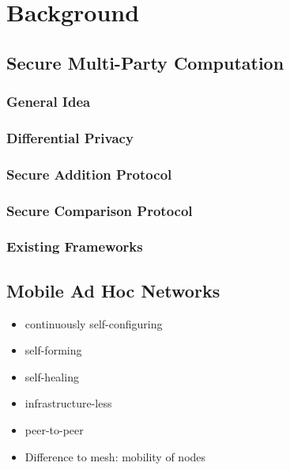 \chapter{Background }
	
	\section{Secure Multi-Party Computation}

		\subsection*{General Idea}

		\subsection*{Differential Privacy}
		
		\subsection*{Secure Addition Protocol}

		\subsection*{Secure Comparison Protocol}

		\subsection*{Existing Frameworks}
	
	\section{Mobile Ad Hoc Networks}
	
		{\color{gray} 
			\begin{itemize}  
				\item continuously self-configuring
				\item self-forming
				\item self-healing
				\item infrastructure-less
				\item peer-to-peer
				\item Difference to mesh: mobility of nodes
			\end{itemize}
		}
	
		
